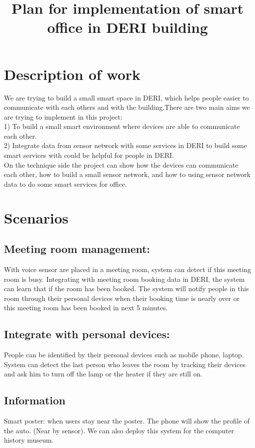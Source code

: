 \documentclass[a4paper]{llncs}
\begin{document}
\title{Plan for implementation of smart office in DERI building}
\maketitle
\section{Description of work}
We are trying to build a small smart space in DERI, which helps people easier to communicate with each others and with the building.There are two main aims we are trying to implement in this project:\\
1) To build a small smart environment where devices are able to communicate each other.\\
2) Integrate data from sensor network with some services in DERI to build some smart services with could be helpful for people in DERI.\\
On the technique side the project can show how the devices can communicate each other, how to build a small sensor network, and how to using sensor network data to do some smart services for office.
\section{Scenarios}
\subsection{Meeting room management: }
 With voice sensor are placed in a meeting room, system can detect if this meeting room is busy. Integrating with meeting room booking data in DERI, the system can learn that if the room has been booked. The system will notify people in this room through their personal devices when their booking time is nearly over or this meeting room has been booked in next 5 minutes.
\subsection{Integrate with personal devices: }
People can be identified by their personal devices such as mobile phone, laptop.  System can detect the last person who leaves the room by tracking their devices and ask him to turn off the lamp or the heater if they are still on.
\subsection{Information}
Smart poster: when users stay near the poster. The phone will show the profile of the auto. (Near by sensor). We can also deploy this system for the computer history museum.
\end{document}
